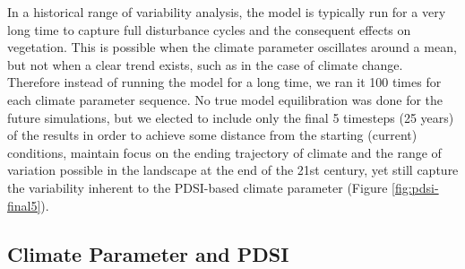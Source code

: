In a historical range of variability analysis, the model is typically run for a very long time to capture full disturbance cycles and the consequent effects on vegetation. This is possible when the climate parameter oscillates around a mean, but not when a clear trend exists, such as in the case of climate change. Therefore instead of running the model for a long time, we ran it 100 times for each climate parameter sequence. No true model equilibration was done for the future simulations, but we elected to include only the final 5 timesteps (25 years) of the results in order to achieve some distance from the starting (current) conditions, maintain focus on the ending trajectory of climate and the range of variation possible in the landscape at the end of the 21st century, yet still capture the variability inherent to the PDSI-based climate parameter (Figure \ref{fig:pdsi-final5}).





\subsection{Climate Parameter and PDSI}


